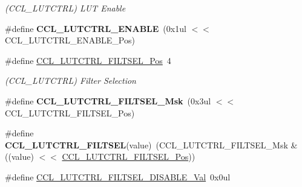 \begin{DoxyCompactItemize}
\begin{DoxyCompactList}\small\item\em (C\+C\+L\+\_\+\+L\+U\+T\+C\+T\+R\+L) L\+U\+T Enable \end{DoxyCompactList}\item 
\hypertarget{group___s_a_m_l21___c_c_l_ga5ab974c3be539661e95fd9edc10a16d9}{}\#define {\bfseries C\+C\+L\+\_\+\+L\+U\+T\+C\+T\+R\+L\+\_\+\+E\+N\+A\+B\+L\+E}~(0x1ul $<$$<$ C\+C\+L\+\_\+\+L\+U\+T\+C\+T\+R\+L\+\_\+\+E\+N\+A\+B\+L\+E\+\_\+\+Pos)\label{group___s_a_m_l21___c_c_l_ga5ab974c3be539661e95fd9edc10a16d9}

\item 
\hypertarget{group___s_a_m_l21___c_c_l_ga671613b8892335b9651f695fb293057a}{}\#define \hyperlink{group___s_a_m_l21___c_c_l_ga671613b8892335b9651f695fb293057a}{C\+C\+L\+\_\+\+L\+U\+T\+C\+T\+R\+L\+\_\+\+F\+I\+L\+T\+S\+E\+L\+\_\+\+Pos}~4\label{group___s_a_m_l21___c_c_l_ga671613b8892335b9651f695fb293057a}

\begin{DoxyCompactList}\small\item\em (C\+C\+L\+\_\+\+L\+U\+T\+C\+T\+R\+L) Filter Selection \end{DoxyCompactList}\item 
\hypertarget{group___s_a_m_l21___c_c_l_ga620fa5ca93dcafccf36a837cc3db3c01}{}\#define {\bfseries C\+C\+L\+\_\+\+L\+U\+T\+C\+T\+R\+L\+\_\+\+F\+I\+L\+T\+S\+E\+L\+\_\+\+Msk}~(0x3ul $<$$<$ C\+C\+L\+\_\+\+L\+U\+T\+C\+T\+R\+L\+\_\+\+F\+I\+L\+T\+S\+E\+L\+\_\+\+Pos)\label{group___s_a_m_l21___c_c_l_ga620fa5ca93dcafccf36a837cc3db3c01}

\item 
\hypertarget{group___s_a_m_l21___c_c_l_ga8910a248a5d2c0c6e149e69698f60079}{}\#define {\bfseries C\+C\+L\+\_\+\+L\+U\+T\+C\+T\+R\+L\+\_\+\+F\+I\+L\+T\+S\+E\+L}(value)~(C\+C\+L\+\_\+\+L\+U\+T\+C\+T\+R\+L\+\_\+\+F\+I\+L\+T\+S\+E\+L\+\_\+\+Msk \& ((value) $<$$<$ \hyperlink{group___s_a_m_l21___c_c_l_ga671613b8892335b9651f695fb293057a}{C\+C\+L\+\_\+\+L\+U\+T\+C\+T\+R\+L\+\_\+\+F\+I\+L\+T\+S\+E\+L\+\_\+\+Pos}))\label{group___s_a_m_l21___c_c_l_ga8910a248a5d2c0c6e149e69698f60079}

\item 
\hypertarget{group___s_a_m_l21___c_c_l_ga269930d96ab20ca97bf3e8dc99362a12}{}\#define \hyperlink{group___s_a_m_l21___c_c_l_ga269930d96ab20ca97bf3e8dc99362a12}{C\+C\+L\+\_\+\+L\+U\+T\+C\+T\+R\+L\+\_\+\+F\+I\+L\+T\+S\+E\+L\+\_\+\+D\+I\+S\+A\+B\+L\+E\+\_\+\+Val}~0x0ul\label{group___s_a_m_l21___c_c_l_ga269930d96ab20ca97bf3e8dc99362a12}


\end{DoxyCompactItemize}
